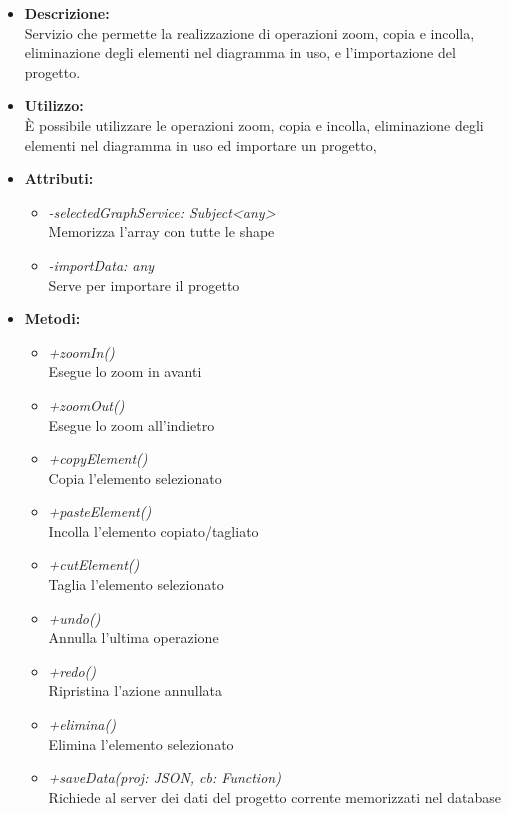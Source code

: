 \begin{itemize}
	\item \textbf{Descrizione:}\\
	Servizio che permette la realizzazione di operazioni zoom, copia e incolla, eliminazione degli elementi nel diagramma in uso, e l’importazione del progetto.
	\item \textbf{Utilizzo:}\\
	È possibile utilizzare le operazioni zoom, copia e incolla, eliminazione degli elementi nel diagramma in uso ed importare un progetto,
	\item \textbf{Attributi:}
		\begin{itemize}
			\item \emph{-selectedGraphService: Subject<any>}\\
			Memorizza l'array con tutte le shape
			\item \emph{-importData: any}\\
			Serve per importare il progetto
		\end{itemize}
	\item \textbf{Metodi:}
		\begin{itemize}
			\item \emph{+zoomIn()}\\
    		Esegue lo zoom in avanti
    		\item \emph{+zoomOut()}\\
    		Esegue lo zoom all'indietro
    		\item \emph{+copyElement()}\\
    		Copia l'elemento selezionato
    		\item \emph{+pasteElement()}\\
    		Incolla l'elemento copiato/tagliato
    		\item \emph{+cutElement()}\\
    		Taglia l'elemento selezionato
    		\item \emph{+undo()}\\
    		Annulla l'ultima operazione
    		\item \emph{+redo()}\\
    		Ripristina l'azione annullata
    		\item \emph{+elimina()}\\
    		Elimina l'elemento selezionato
    		\item \emph{+saveData(proj: JSON, cb: Function)}\\
    		Richiede al server dei dati del progetto corrente memorizzati nel database\\

\end{itemize}
\end{itemize}
